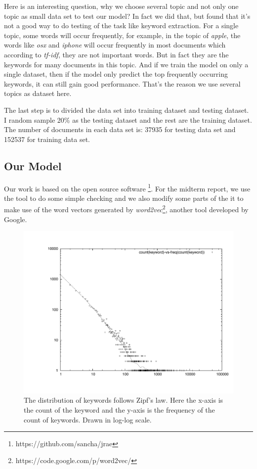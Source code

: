\documentclass[dvips,9pt]{article}
\begin{document}
        Here is an interesting question, why we choose several topic and not only one topic as small data set to test our model? In fact we did that, but found that it's not a good way to do testing of the task like keyword extraction. For a single topic, some words will occur frequently, for example, in the topic of \emph{apple}, the words like \emph{osx} and \emph{iphone} will occur frequently in most documents which according to \emph{tf-idf}, they are not important words. But in fact they are the keywords for many documents in this topic. And if we train the model on only a single dataset, then if the model only predict the top frequently occurring keywords, it can still gain good performance. That's the reason we use several topics as dataset here.
        
        The last step is to divided the data set into training dataset and testing dataset. I random sample 20\% as the testing dataset and the rest are the training dataset. The number of documents in each data set is: 37935 for testing data set and 152537 for training data set.
        \subsection{Our Model}
        Our work is based on the open source software \footnote{https://github.com/sancha/jrae}. For the midterm report, we use the tool to do some simple checking and we also modify some parts of the it to make use of the word vectors generated by \emph{word2vec}\footnote{https://code.google.com/p/word2vec/}, another tool developed by Google.
        
         \begin{figure}
         \includegraphics[scale=0.5]{dist.pdf}
         \caption{The distribution of keywords follows Zipf's law. Here the x-axis is the count of the keyword and the y-axis is the frequency of the count of keywords. Drawn in log-log scale.}
         \label{zips}
        \end{figure}
        
\end{document}
